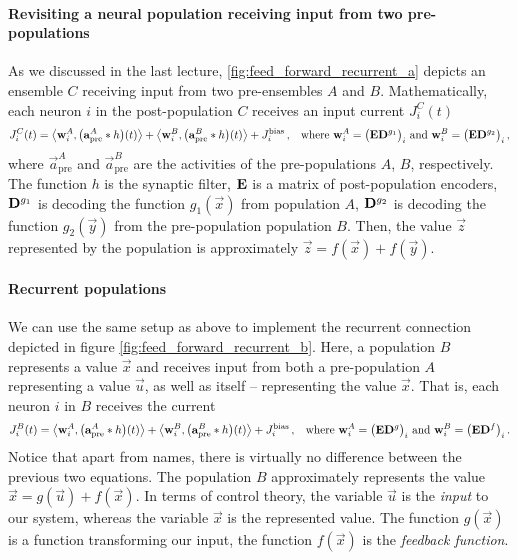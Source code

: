 \documentclass[10pt,letterpaper,oneside]{article}
\begin{document}
\paragraph{Revisiting a neural population receiving input from two pre-populations}
As we discussed in the last lecture, \cref{fig:feed_forward_recurrent_a} depicts an ensemble $C$ receiving input from two pre-ensembles $A$ and $B$. Mathematically, each neuron $i$ in the post-population $C$ receives an input current $J^C_i(t)$
\begin{align*}
	J^C_i(t) &= \big\langle {\mathbf{w}}_i^A , \big ( {\mathbf{a}}^{A}_\mathrm{pre} \ast h \big)(t) \big\rangle
	        + \big\langle {\mathbf{w}}_i^B , \big ( {\mathbf{a}}^{B}_\mathrm{pre} \ast h \big)(t) \big\rangle
	        + J^\mathrm{bias}_i \,,
	       & \text{where } {\mathbf{w}}^A_i = \big( {\mathbf{E}} {\mathbf{D}}^{g_1} \big)_i \text{ and } {\mathbf{w}}^B_i = \big( {\mathbf{E}} {\mathbf{D}}^{g_2} \big)_i \,,
\end{align*}
where $\vec a^{A}_\mathrm{pre}$ and $\vec a^{B}_\mathrm{pre}$ are the activities of the pre-populations $A$, $B$, respectively. The function $h$ is the synaptic filter, ${\mathbf{E}}$ is a matrix of post-population encoders, ${\mathbf{D}}^{g_1}$ is decoding the function $g_1(\vec x)$ from population $A$, ${\mathbf{D}}^{g_2}$ is decoding the function ${g_2}(\vec y)$ from the pre-population population $B$. Then, the value $\vec z$ represented by the population is approximately $\vec z = f(\vec x) + f(\vec y)$.

\paragraph{Recurrent populations}
We can use the same setup as above to implement the recurrent connection depicted in figure \cref{fig:feed_forward_recurrent_b}. Here, a population $B$ represents a value $\vec x$ and receives input from both a pre-population $A$ representing a value $\vec u$, as well as itself -- representing the value $\vec x$. That is, each neuron $i$ in $B$ receives the current
\begin{align*}
	J^B_i(t) &= \big\langle {\mathbf{w}}_i^A , \big ( {\mathbf{a}}^{A}_\mathrm{pre} \ast h \big)(t) \big\rangle
			+ \big\langle {\mathbf{w}}_i^B , \big ( {\mathbf{a}}^{B}_\mathrm{pre} \ast h \big)(t) \big\rangle
			+ J^\mathrm{bias}_i \,,
			& \text{where } {\mathbf{w}}^A_i = \big( {\mathbf{E}} {\mathbf{D}}^{g} \big)_i \text{ and } {\mathbf{w}}^B_i = \big( {\mathbf{E}} {\mathbf{D}}^{f} \big)_i \,.
\end{align*}
Notice that apart from names, there is virtually no difference between the previous two equations. The population $B$ approximately represents the value $\vec x = g(\vec u) + f(\vec x)$. In terms of control theory, the variable $\vec u$ is the \emph{input} to our system, whereas the variable $\vec x$ is the represented value. The function $g(\vec x)$ is a function transforming our input, the function $f(\vec x)$ is the \emph{feedback function}.
\end{document}
